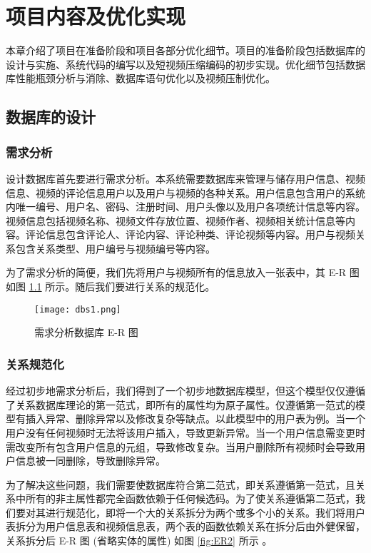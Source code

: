 \chapter{项目内容及优化实现}\label{sec:algorithm}

本章介绍了项目在准备阶段和项目各部分优化细节。项目的准备阶段包括数据库的设计与实施、系统代码的编写以及短视频压缩编码的初步实现。优化细节包括数据库性能瓶颈分析与消除、数据库语句优化以及视频压制优化。

\section{数据库的设计}
 
\subsection{需求分析}
设计数据库首先要进行需求分析。本系统需要数据库来管理与储存用户信息、视频信息、视频的评论信息用户以及用户与视频的各种关系。用户信息包含用户的系统内唯一编号、用户名、密码、注册时间、用户头像以及用户各项统计信息等内容。视频信息包括视频名称、视频文件存放位置、视频作者、视频相关统计信息等内容。评论信息包含评论人、评论内容、评论种类、评论视频等内容。用户与视频关系包含关系类型、用户编号与视频编号等内容。

为了需求分析的简便，我们先将用户与视频所有的信息放入一张表中，其 E-R 图如图 \ref{fig:ER1} 所示。随后我们要进行关系的规范化。

\begin{figure}[!ht]
    \centering
    \texttt{[image: dbs1.png]}
    \caption{需求分析数据库 E-R 图}
    \label{fig:ER1}
\end{figure}


\subsection{关系规范化}

经过初步地需求分析后，我们得到了一个初步地数据库模型，但这个模型仅仅遵循了关系数据库理论的第一范式，即所有的属性均为原子属性。仅遵循第一范式的模型有插入异常、删除异常以及修改复杂等缺点。以此模型中的用户表为例。当一个用户没有任何视频时无法将该用户插入，导致更新异常。当一个用户信息需变更时需改变所有包含用户信息的元组，导致修改复杂。当用户删除所有视频时会导致用户信息被一同删除，导致删除异常。

为了解决这些问题，我们需要使数据库符合第二范式，即关系遵循第一范式，且关系中所有的非主属性都完全函数依赖于任何候选码。为了使关系遵循第二范式，我们要对其进行规范化，即将一个大的关系拆分为两个或多个小的关系。我们将用户表拆分为用户信息表和视频信息表，两个表的函数依赖关系在拆分后由外健保留，关系拆分后 E-R 图 (省略实体的属性) 如图 \ref{fig:ER2} 所示 。

